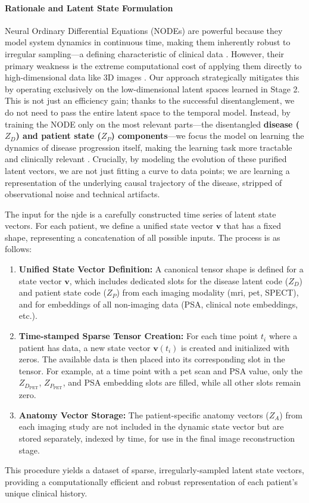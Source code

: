 \documentclass[11pt, a4paper]{article}
\begin{document}
\paragraph{Rationale and Latent State Formulation}
Neural Ordinary Differential Equations (NODEs) are powerful because they model system dynamics in continuous time, making them inherently robust to irregular sampling—a defining characteristic of clinical data \cite{GwakSim2020, JohnsonBulgarelli2023, BelogolovskyGreenberg2023}. However, their primary weakness is the extreme computational cost of applying them directly to high-dimensional data like 3D images \cite{WiewelBecher2018, DavisChoromanski2020}. Our approach strategically mitigates this by operating exclusively on the low-dimensional latent spaces learned in Stage 2. This is not just an efficiency gain; thanks to the successful disentanglement, we do not need to pass the entire latent space to the temporal model. Instead, by training the NODE only on the most relevant parts—the disentangled \textbf{disease ($Z_D$) and patient state ($Z_P$) components}—we focus the model on learning the dynamics of disease progression itself, making the learning task more tractable and clinically relevant \cite{AshmanSo2020, KberKalisch2023, LosadaTerranova2024}. Crucially, by modeling the evolution of these purified latent vectors, we are not just fitting a curve to data points; we are learning a representation of the underlying causal trajectory of the disease, stripped of observational noise and technical artifacts.

The input for the \gls{njde} is a carefully constructed time series of latent state vectors. For each patient, we define a unified state vector $\mathbf{v}$ that has a fixed shape, representing a concatenation of all possible inputs. The process is as follows:
\begin{enumerate}
    \item \textbf{Unified State Vector Definition:} A canonical tensor shape is defined for a state vector $\mathbf{v}$, which includes dedicated slots for the disease latent code ($Z_D$) and patient state code ($Z_P$) from each imaging modality (\gls{mri}, \gls{pet}, SPECT), and for embeddings of all non-imaging data (PSA, clinical note embeddings, etc.).
    \item \textbf{Time-stamped Sparse Tensor Creation:} For each time point $t_i$ where a patient has data, a new state vector $\mathbf{v}(t_i)$ is created and initialized with zeros. The available data is then placed into its corresponding slot in the tensor. For example, at a time point with a \gls{pet} scan and PSA value, only the $Z_{D_{\text{PET}}}$, $Z_{P_{\text{PET}}}$, and PSA embedding slots are filled, while all other slots remain zero.
    \item \textbf{Anatomy Vector Storage:} The patient-specific anatomy vectors ($Z_A$) from each imaging study are not included in the dynamic state vector but are stored separately, indexed by time, for use in the final image reconstruction stage.
\end{enumerate}
This procedure yields a dataset of sparse, irregularly-sampled latent state vectors, providing a computationally efficient and robust representation of each patient's unique clinical history.
\end{document}
